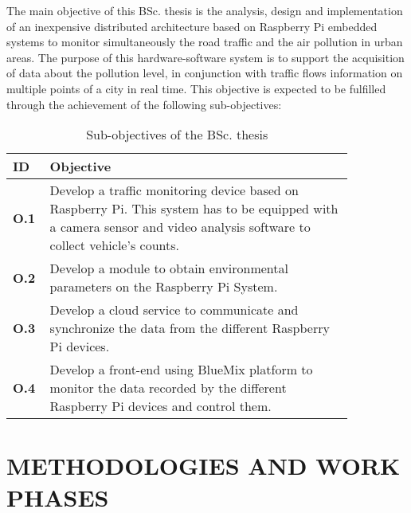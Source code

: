 \documentclass{pre-tfg}
\begin{document}
The main objective of this BSc. thesis is the analysis, design and implementation of an inexpensive distributed architecture based on Raspberry Pi embedded systems to monitor simultaneously the road traffic and the air pollution in urban areas. The purpose of this hardware-software system is to support the acquisition of data about the pollution level, in conjunction with traffic flows information on multiple points of a city in real time. This objective is expected to be fulfilled through the achievement of the following sub-objectives:

\begin{table}[!h]
	\centering
	\caption{Sub-objectives of the BSc. thesis}
	\label{tab:sub-objectives}
	
	\begin{tabular}{m{0.05\linewidth}m{0.8\linewidth}}
		\textbf{ID} & \textbf{Objective} \\
		\hline
		
		\textbf{O.1}& Develop a traffic monitoring device based on Raspberry Pi. This system has to be equipped with a camera sensor and video analysis software to collect vehicle’s counts.  \\
		
		\textbf{O.2}& Develop a module to obtain environmental parameters on the Raspberry Pi System.  \\
		
		\textbf{O.3}& Develop a cloud service to communicate and synchronize the data from the different Raspberry Pi devices.  \\
		
		\textbf{O.4}& Develop a front-end using BlueMix platform to monitor the data recorded by the different Raspberry Pi devices and control them.  \\
		
		\hline
	\end{tabular}
\end{table}


\section{METHODOLOGIES AND WORK PHASES}
\end{document}

